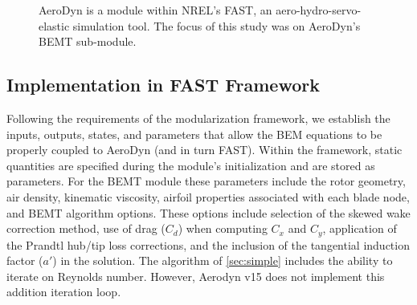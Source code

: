 \documentclass[]{aiaa-tc}%
\begin{document}
\begin{figure}[htbp]
\centering
 \qquad
 \caption{AeroDyn is a module within NREL's FAST, an aero-hydro-servo-elastic simulation tool.  The focus of this study was on AeroDyn's BEMT sub-module.}
 \label{fig:FAST}
\end{figure}
 


\subsection{Implementation in FAST Framework}

Following the requirements of the modularization framework, we establish the inputs, outputs, states, and parameters that allow the BEM equations to be properly coupled to AeroDyn (and in turn FAST).  Within the framework, static quantities are specified during the module's initialization and are stored as parameters.  For the BEMT module these parameters include the rotor geometry, air density, kinematic viscosity, airfoil properties associated with each blade node, and BEMT algorithm options.  These options include selection of the skewed wake correction method, use of drag ($C_d$) when computing $C_x$ and $C_y$, application of the Prandtl hub/tip loss corrections, and the inclusion of the tangential induction factor ($a'$) in the solution.  The algorithm of \cref{sec:simple} includes the ability to iterate on Reynolds number.  However, Aerodyn v15 does not implement this addition iteration loop.
\end{document}
